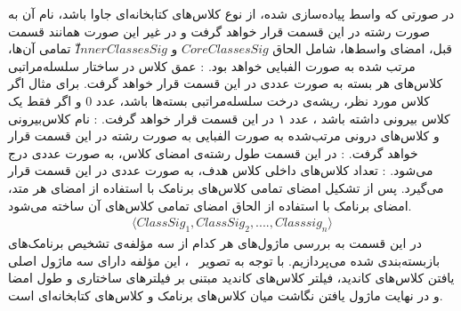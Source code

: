  در صورتی که واسط پیاده‌سازی شده، از نوع کلاس‌های کتابخانه‌ای جاوا باشد، نام آن به صورت رشته در این قسمت قرار خواهد گرفت و در غیر این صورت همانند قسمت قبل، امضای واسط‌ها، شامل الحاق $CoreClassesSig$ و $ّInnerClassesSig$ تمامی آن‌ها، مرتب شده به صورت الفبایی خواهد بود.
: عمق کلاس در ساختار سلسله‌مراتبی کلاس‌های هر بسته به صورت عددی در این قسمت قرار خواهد گرفت. برای مثال اگر کلاس مورد نظر، ریشه‌ی درخت سلسله‌مراتبی بسته‌ها باشد، عدد 0 و اگر فقط یک کلاس بیرونی داشته باشد ، عدد ۱ در این قسمت قرار خواهد گرفت.
: نام کلاس‌بیرونی و کلاس‌های درونی مرتب‌شده به صورت الفبایی به صورت رشته در این قسمت قرار خواهد گرفت.
: در این قسمت  طول رشته‌ی امضای کلاس، به صورت عددی درج می‌شود.
: تعداد کلاس‌های داخلی کلاس هدف، به صورت عددی در این قسمت قرار می‌گیرد.
پس از تشکیل امضای تمامی کلاس‌های برنامک با استفاده از امضای هر متد، امضای برنامک با استفاده از الحاق امضای تمامی کلاس‌های آن ساخته می‌شود. 
\begin{equation}
\begin{split}
\langle ClassSig_1,ClassSig_2, ...., Classsig_n \rangle
\end{split}
\end{equation}
در این قسمت به بررسی ماژول‌های هر کدام از سه مؤلفه‌ی تشخیص برنامک‌های بازبسته‌بندی شده می‌پردازیم.
با توجه به تصویر ~، این مؤلفه‌ دارای سه ماژول اصلی یافتن کلاس‌های کاندید، فیلتر کلاس‌های کاندید مبتنی بر فیلتر‌های ساختاری و طول امضا و در نهایت ماژول یافتن نگاشت میان کلاس‌های برنامک و کلاس‌های کتابخانه‌ای است.

